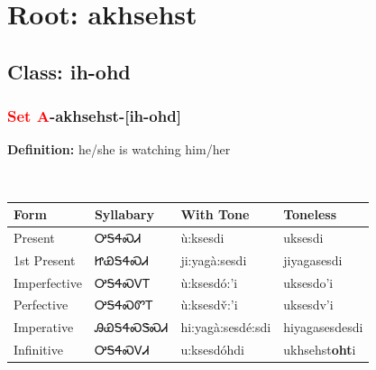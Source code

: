 \needspace{4in}
\section*{Root: akhsehst}
\nopagebreak
{}
\needspace{3in}
\subsection*{Class: ih-ohd}
\nopagebreak
\needspace{2in}
\subsubsection*{\textcolor{Red}{Set A}{-}\textbf{akhsehst}{-}[ih-ohd]}
\nopagebreak
\textbf{Definition: } he/she is watching him/her
\\[0.5em]
\begin{tabularx}{\textwidth}{l X X X}%
\toprule%
\textbf{Form}&\textbf{Syllabary}&\textbf{With Tone}&\textbf{Toneless}\\%
\midrule%
Present&ᎤᎦᏎᏍᏗ&ù:ksesdi&uksesdi\\%
1st Present&ᏥᏯᎦᏎᏍᏗ&ji:yagà:sesdi&jiyagasesdi\\%
Imperfective&ᎤᎦᏎᏍᏙᎢ&ù:ksesdó:’i&uksesdo{\textquoteright}i\\%
Perfective&ᎤᎦᏎᏍᏛᎢ&ù:ksesdv̌:’i&uksesdv{\textquoteright}i\\%
Imperative&ᎯᏯᎦᏎᏍᏕᏍᏗ&hi:yagà:sesdé:sdi&hiyagasesdesdi\\%
Infinitive&ᎤᎦᏎᏍᏙᏗ&u:ksesdóhdi&ukhsehst\textbf{oht}i\\%
\bottomrule%
\end{tabularx}
\\[1em]